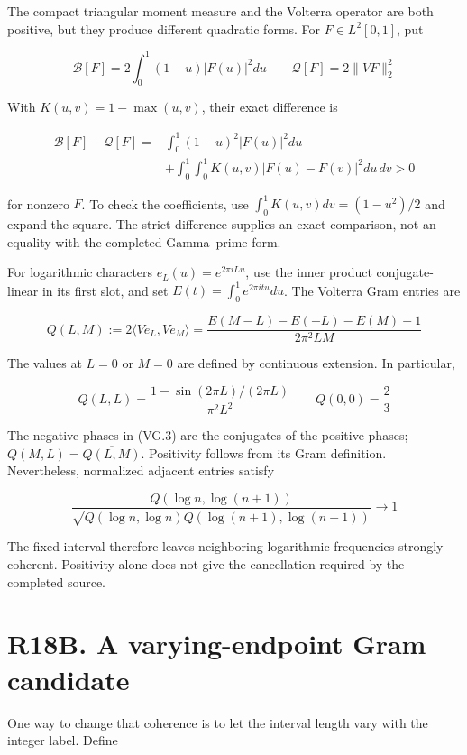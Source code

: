 \documentclass[
  11pt,
]{book}
\begin{document}
The compact triangular moment measure and the Volterra operator are both
positive, but they produce different quadratic forms. For
\(F\in L^2[0,1]\), put

\[
\mathcal B[F]=2\int_0^1(1-u)|F(u)|^2du
\qquad \mathcal Q[F]=2\|VF\|_2^2
\tag{VG.1}
\]

With \(K(u,v)=1-\max(u,v)\), their exact difference is

\[
\boxed{\begin{aligned}
\mathcal B[F]-\mathcal Q[F]
={}&\int_0^1(1-u)^2|F(u)|^2du\\
&+\int_0^1\!\int_0^1K(u,v)|F(u)-F(v)|^2du\,dv>0
\end{aligned}}
\tag{VG.2}
\]

for nonzero \(F\). To check the coefficients, use
\(\int_0^1K(u,v)dv=(1-u^2)/2\) and expand the square. The strict
difference supplies an exact comparison, not an equality with the
completed Gamma--prime form.

For logarithmic characters \(e_L(u)=e^{2\pi iLu}\), use the inner
product conjugate-linear in its first slot, and set
\(E(t)=\int_0^1e^{2\pi itu}du\). The Volterra Gram entries are

\[
\boxed{Q(L,M):=2\langle Ve_L,Ve_M\rangle
=\frac{E(M-L)-E(-L)-E(M)+1}{2\pi^2LM}}
\tag{VG.3}
\]

The values at \(L=0\) or \(M=0\) are defined by continuous extension. In
particular,

\[
Q(L,L)=\frac{1-\sin(2\pi L)/(2\pi L)}{\pi^2L^2}
\qquad Q(0,0)=\frac23
\tag{VG.4}
\]

The negative phases in (VG.3) are the conjugates of the positive phases;
\(Q(M,L)=\overline{Q(L,M)}\). Positivity follows from its Gram
definition. Nevertheless, normalized adjacent entries satisfy

\[
\frac{Q(\log n,\log(n+1))}
{\sqrt{Q(\log n,\log n)Q(\log(n+1),\log(n+1))}}
\longrightarrow1
\tag{VG.5}
\]

The fixed interval therefore leaves neighboring logarithmic frequencies
strongly coherent. Positivity alone does not give the cancellation
required by the completed source.

\section{R18B. A varying-endpoint Gram
candidate}\label{r18b.-a-varying-endpoint-gram-candidate}

One way to change that coherence is to let the interval length vary with
the integer label. Define
\end{document}
